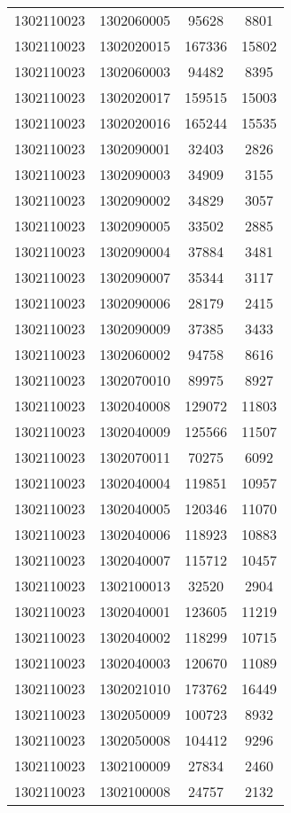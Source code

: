 \begin{longtable}[h]{llcc}
		1302110023 & 1302060005 & 95628 & 8801\\
		1302110023 & 1302020015 & 167336 & 15802\\
		1302110023 & 1302060003 & 94482 & 8395\\
		1302110023 & 1302020017 & 159515 & 15003\\
		1302110023 & 1302020016 & 165244 & 15535\\
		1302110023 & 1302090001 & 32403 & 2826\\
		1302110023 & 1302090003 & 34909 & 3155\\
		1302110023 & 1302090002 & 34829 & 3057\\
		1302110023 & 1302090005 & 33502 & 2885\\
		1302110023 & 1302090004 & 37884 & 3481\\
		1302110023 & 1302090007 & 35344 & 3117\\
		1302110023 & 1302090006 & 28179 & 2415\\
		1302110023 & 1302090009 & 37385 & 3433\\
		1302110023 & 1302060002 & 94758 & 8616\\
		1302110023 & 1302070010 & 89975 & 8927\\
		1302110023 & 1302040008 & 129072 & 11803\\
		1302110023 & 1302040009 & 125566 & 11507\\
		1302110023 & 1302070011 & 70275 & 6092\\
		1302110023 & 1302040004 & 119851 & 10957\\
		1302110023 & 1302040005 & 120346 & 11070\\
		1302110023 & 1302040006 & 118923 & 10883\\
		1302110023 & 1302040007 & 115712 & 10457\\
		1302110023 & 1302100013 & 32520 & 2904\\
		1302110023 & 1302040001 & 123605 & 11219\\
		1302110023 & 1302040002 & 118299 & 10715\\
		1302110023 & 1302040003 & 120670 & 11089\\
		1302110023 & 1302021010 & 173762 & 16449\\
		1302110023 & 1302050009 & 100723 & 8932\\
		1302110023 & 1302050008 & 104412 & 9296\\
		1302110023 & 1302100009 & 27834 & 2460\\
		1302110023 & 1302100008 & 24757 & 2132\\

\end{longtable}
